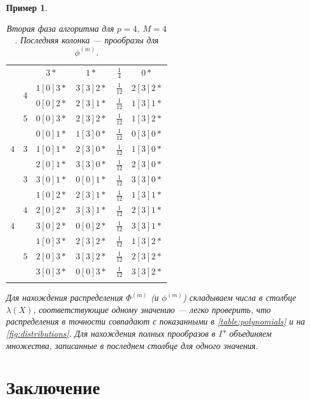 \documentclass[14pt, a4paper, russian]{report}
\newtheorem{example}{\indent Пример}
\begin{document}
\begin{example}
\begin{longtable}{|c|c|c|c|c|c|}
                    &     &  $3*$     & $1*$     & $\frac{1}{4} $ & $0*$     \\ \cline{2-6}
                    & \multirow{2}{*}{$4$}
                          &  $1[0]3*$ & $3[3]2*$ & $\frac{1}{12}$ & $2[3]2*$ \\
                    &     &  $0[0]2*$ & $2[3]1*$ & $\frac{1}{12}$ & $1[3]1*$ \\ \cline{2-6}
                    & $5$ &  $0[0]3*$ & $2[3]2*$ & $\frac{1}{12}$ & $1[3]2*$ \\ \hline
\multirow{3}{*}{$4$}& \multirow{3}{*}{$3$}
                          & $0[0]1*$ & $1[3]0*$ & $\frac{1}{12}$ & $0[3]0*$ \\ 
                    &     & $1[0]1*$ & $2[3]0*$ & $\frac{1}{12}$ & $1[3]0*$ \\
                    &     & $2[0]1*$ & $3[3]0*$ & $\frac{1}{12}$ & $2[3]0*$ \\ \hline
\multirow{7}{*}{$4$}& $3$ & $3[0]1*$ & $0[0]1*$ & $\frac{1}{12}$ & $3[3]0*$ \\ \cline{2-6}
     &\multirow{3}{*}{$4$} & $1[0]2*$ & $2[3]1*$ & $\frac{1}{12}$ & $1[3]1*$ \\
     &                     & $2[0]2*$ & $3[3]1*$ & $\frac{1}{12}$ & $2[3]1*$ \\
     &                     & $3[0]2*$ & $0[0]2*$ & $\frac{1}{12}$ & $3[3]1*$ \\ \cline{2-6}
    &\multirow{3}{*}{$5$} & $1[0]3*$ & $2[3]2*$ & $\frac{1}{12}$ & $1[3]2*$ \\
    &                     & $2[0]3*$ & $3[3]2*$ & $\frac{1}{12}$ & $2[3]2*$ \\
    &                     & $3[0]3*$ & $0[0]3*$ & $\frac{1}{12}$ & $3[3]2*$ \\ \hline               
                   
\caption{\label{table:algorithm_second_phase} Вторая фаза алгоритма для $p=4,\ M=4$. Последняя колонка --- прообразы для $\phi^{(m)}$.}                   
\end{longtable}
Для нахождения распределения $\Phi^{(m)}$ (и $\phi^{(m)}$) складываем числа в столбце $\lambda(X)$, соответствующие одному значению --- легко проверить, что распределения в точности совпадают с показанными в \cref{table:polynomials} и на \cref{fig:distributions}. Для нахождения полных прообразов в $\Gamma'$ объединяем множества, записанные в последнем столбце для одного значения.
\end{example}
\chapter*{Заключение}

\newpage

\end{document}
